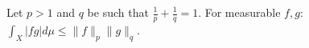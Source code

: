 Let $p > 1$ and $q$ be such that $\frac{1}{p} + \frac{1}{q} = 1$. For measurable $f, g$: $\int_X |fg| d\mu \leq \|f\|_p \|g\|_q$.
